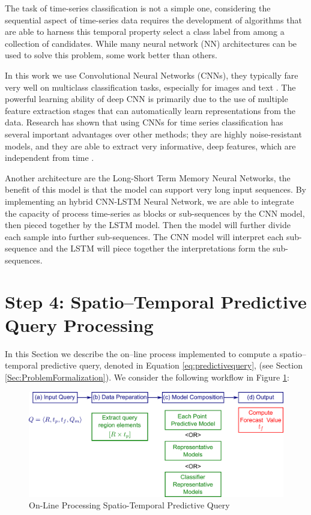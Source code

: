 The task of time-series classification is not a simple one, considering the sequential aspect of time-series data requires the development of algorithms that are able to harness this temporal property select a class label from among a collection of candidates. While many neural network (NN) architectures can be used to solve this problem, some work better than others. 

In this work we use Convolutional Neural Networks (CNNs), they typically fare very well on multiclass classification tasks, especially for images and text \cite{Fawaz2019}. The powerful learning ability of deep CNN is primarily due to the use of multiple feature extraction stages that can automatically learn representations from the data. Research has shown that using CNNs for time series classification has several important advantages over other methods; they are highly noise-resistant models, and they are able to extract very informative, deep features, which are independent from time \cite{Sainath2015}.

Another architecture are the Long-Short Term Memory Neural Networks, the benefit of this model is that the model can support very long input sequences. By implementing an hybrid CNN-LSTM Neural Network, we are able to integrate the capacity of process time-series as blocks or sub-sequences by the CNN model, then pieced together by the LSTM model. Then the model will further divide each sample into further sub-sequences. The CNN model will interpret each sub-sequence and the LSTM will piece together the interpretations form the sub-sequences. 

\section{Step 4: Spatio--Temporal Predictive Query Processing}
\label{Sec:SpatioTemporalQueryProcessing}	

In this Section we describe the on--line process implemented to compute a spatio--temporal predictive query, denoted in Equation \ref{eq:predictivequery}, (see Section \ref{Sec:ProblemFormalization}). We consider the following workflow in Figure \ref{Fig:OnLineQP}: 

\begin{figure}[h]
	\centering
	\includegraphics[scale=0.35]{../Figures/Query_Processing}
	\caption{On-Line Processing Spatio-Temporal Predictive Query}
	\label{Fig:OnLineQP}
\end{figure}

